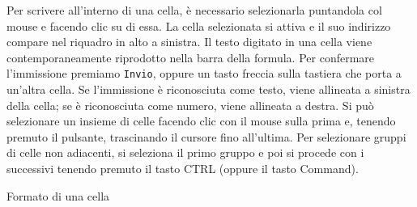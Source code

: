 \documentclass[12pt,a4paper,oneside]{book}
\makeatletter
\renewcommand{\subsection}{\@startsection {subsection}{2}{\z@}
{-3ex \@plus -0.1ex \@minus -.4ex}
{0.5ex \@plus.2ex }
{\color[rgb]{0.141,0.596,0.749}\normalfont\sffamily\bfseries}}
\theoremstyle{esercizio}
\makeatother
\begin{document}
Per scrivere all'interno di una cella, è necessario selezionarla puntandola col mouse e facendo clic su di essa. La cella selezionata si attiva e il suo indirizzo compare nel riquadro in alto a sinistra.
Il testo digitato in una cella viene contemporaneamente riprodotto nella barra della formula. Per confermare l'immissione premiamo \texttt{Invio}, oppure un tasto freccia sulla tastiera che porta a un'altra cella.
Se l'immissione è riconosciuta come testo, viene allineata a sinistra della cella; se è riconosciuta come numero, viene allineata a destra.
Si può selezionare un insieme di celle facendo clic con il mouse sulla prima e, tenendo premuto il pulsante, trascinando il cursore fino all'ultima. Per selezionare gruppi di celle non adiacenti, si seleziona il primo gruppo e poi si procede con i successivi tenendo premuto il tasto CTRL (oppure il tasto Command).

\subsection{Formato di una cella}
\end{document}
